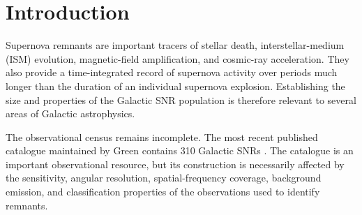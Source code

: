 \documentclass[
aps,
prd,
reprint,
superscriptaddress,
nofootinbib
]{revtex4-2}
\begin{document}
\begin{abstract}
		Across 500 independent Monte Carlo realisations, the reference model produces
		a mean of
		$480.1\pm14.3$ detectable remnants.  The reduction from the mean physical
		population of approximately 2000 objects to the simulated observable
		population demonstrates the substantial effect of the adopted surface-brightness
		and angular-scale selection criteria.  The undetected population is dominated
		by evolved remnants, particularly late Sedov--Taylor objects in relatively
		low-density environments, for which expansion produces large angular sizes
		and reduced radio surface brightness.
		
		The simulation does not provide a unique estimate of the total Galactic SNR
		population because its selection function is deliberately idealised and does
		not reproduce the heterogeneous surveys from which the observational catalogue
		has been assembled.  Nevertheless, the result demonstrates quantitatively that
		observational selection can substantially alter the apparent Galactic SNR
		census.  The continuing discovery of SNR candidates in sensitive surveys such
		as the SARAO MeerKAT Galactic Plane Survey provides an empirical context for
		such forward population modelling.
		
	\end{abstract}
	
	
	\maketitle
	
	\section{Introduction}
	\label{sec:introduction}
	
	Supernova remnants are important tracers of stellar death, interstellar-medium
	(ISM) evolution, magnetic-field amplification, and cosmic-ray acceleration.
	They also provide a time-integrated record of supernova activity over periods
	much longer than the duration of an individual supernova explosion.  Establishing
	the size and properties of the Galactic SNR population is therefore relevant
	to several areas of Galactic astrophysics.
	
	The observational census remains incomplete.  The most recent published
	catalogue maintained by Green contains 310 Galactic SNRs
	\cite{Green2025}.  The catalogue is an important observational resource, but
	its construction is necessarily affected by the sensitivity, angular
	resolution, spatial-frequency coverage, background emission, and classification
	properties of the observations used to identify remnants.
	
\end{document}
